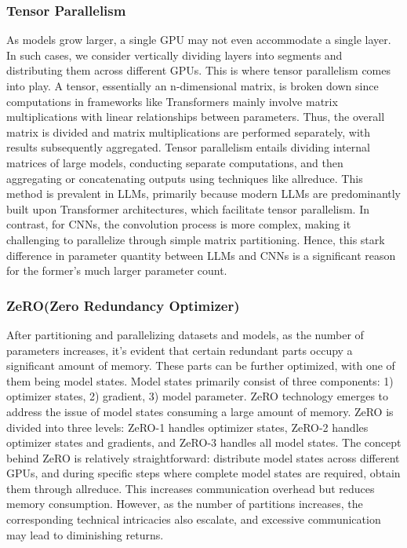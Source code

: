 \documentclass[conference]{IEEEtran}
\begin{document}
\subsubsection{Tensor Parallelism}
As models grow larger, a single GPU may not even accommodate a single layer. In such cases, we consider vertically dividing layers into segments and distributing them across different GPUs. This is where tensor parallelism comes into play.
A tensor, essentially an n-dimensional matrix, is broken down since computations in frameworks like Transformers mainly involve matrix multiplications with linear relationships between parameters. Thus, the overall matrix is divided and matrix multiplications are performed separately, with results subsequently aggregated.
Tensor parallelism entails dividing internal matrices of large models, conducting separate computations, and then aggregating or concatenating outputs using techniques like allreduce. This method is prevalent in LLMs, primarily because modern LLMs are predominantly built upon Transformer architectures, which facilitate tensor parallelism. In contrast, for CNNs, the convolution process is more complex, making it challenging to parallelize through simple matrix partitioning. Hence, this stark difference in parameter quantity between LLMs and CNNs is a significant reason for the former's much larger parameter count.

\subsubsection{ZeRO(Zero Redundancy Optimizer)}
After partitioning and parallelizing datasets and models, as the number of parameters increases, it's evident that certain redundant parts occupy a significant amount of memory. These parts can be further optimized, with one of them being model states.
Model states primarily consist of three components: 1) optimizer states, 2) gradient, 3) model parameter.
ZeRO technology emerges to address the issue of model states consuming a large amount of memory. ZeRO is divided into three levels: ZeRO-1 handles optimizer states, ZeRO-2 handles optimizer states and gradients, and ZeRO-3 handles all model states.
The concept behind ZeRO is relatively straightforward: distribute model states across different GPUs, and during specific steps where complete model states are required, obtain them through allreduce. This increases communication overhead but reduces memory consumption. However, as the number of partitions increases, the corresponding technical intricacies also escalate, and excessive communication may lead to diminishing returns.
\end{document}
